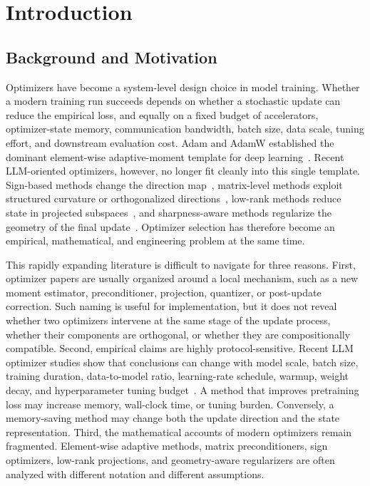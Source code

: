 \section{Introduction}
\label{sec:intro}


\subsection{Background and Motivation}
\label{sec:intro-background}

Optimizers have become a system-level design choice in model training.  Whether a modern training run succeeds depends on whether a stochastic update can reduce the empirical loss, and equally on a fixed budget of accelerators, optimizer-state memory, communication bandwidth, batch size, data scale, tuning effort, and downstream evaluation cost.  
Adam and AdamW established the dominant element-wise adaptive-moment template for deep learning~\cite{kingma2015adam,loshchilov2019decoupled}. Recent LLM-oriented optimizers, however, no longer fit cleanly into this single template.  Sign-based methods change the direction map~\cite{chen2023symbolic}, matrix-level methods exploit structured curvature or orthogonalized directions~\cite{gupta2018shampoo}, low-rank methods reduce state in projected subspaces~\cite{zhao2024galore}, and sharpness-aware methods regularize the geometry of the final update~\cite{foret2021sharpness}.  
Optimizer selection has therefore become an empirical, mathematical, and engineering problem at the same time.

This rapidly expanding literature is difficult to navigate for three reasons. First, optimizer papers are usually organized around a local mechanism, such as a new moment estimator, preconditioner, projection, quantizer, or post-update correction. Such naming is useful for implementation, but it does not reveal whether two optimizers intervene at the same stage of the update process, whether their components are orthogonal, or whether they are compositionally compatible.  Second, empirical claims are highly protocol-sensitive.  Recent LLM optimizer studies show that conclusions can change with model scale, batch size, training duration, data-to-model ratio, learning-rate schedule, warmup, weight decay, and hyperparameter tuning budget~\cite{zhao2025deconstructing,semenov2025benchmarking,wen2025fantastic}.
A method that improves pretraining loss may increase memory, wall-clock time, or tuning burden.  Conversely, a memory-saving method may change both the update direction and the state representation. 
Third, the mathematical accounts of modern optimizers remain fragmented.  Element-wise adaptive methods, matrix preconditioners, sign optimizers, low-rank projections, and geometry-aware regularizers are often analyzed with different notation and different assumptions.

